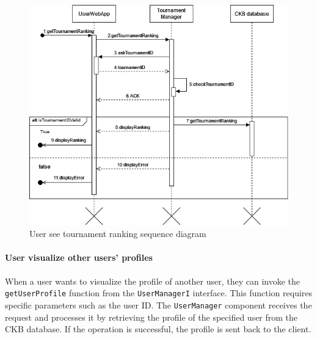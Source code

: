 \begin{figure}[H]
    \begin{center}
        \includegraphics[width=\linewidth]{Images/sequence/Sd_seeTournamentRanking.png}
        \caption{User see tournament ranking sequence diagram}
        \label{fig:user_see_tournament_ranking} 
    \end{center}
\end{figure}


\paragraph{User visualize other users' profiles}
When a user wants to visualize the profile of another user, they can invoke the \verb|getUserProfile| function from the \verb|UserManagerI| interface. This function requires specific parameters such as the user ID.
The \verb|UserManager| component receives the request and processes it by retrieving the profile of the specified user from the CKB database. If the operation is successful, the profile is sent back to the client.


